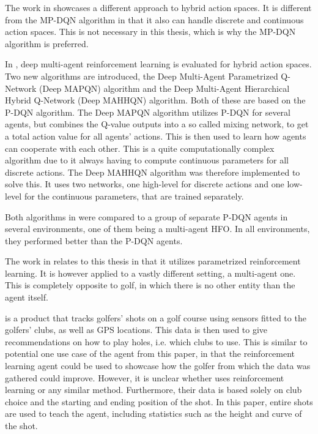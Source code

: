 \documentclass{kththesis}
\begin{document}
The work in \textcite{delalleau2019discrete} showcases a different approach to hybrid action spaces. It is different from the MP-DQN algorithm in that it also can handle discrete and continuous action spaces. This is not necessary in this thesis, which is why the MP-DQN algorithm is preferred.

In \textcite{fu2019deep}, deep multi-agent reinforcement learning is evaluated for hybrid action spaces. Two new algorithms are introduced, the Deep Multi-Agent Parametrized Q-Network (Deep MAPQN) algorithm and the Deep Multi-Agent Hierarchical Hybrid Q-Network (Deep MAHHQN) algorithm. Both of these are based on the P-DQN algorithm. The Deep MAPQN algorithm utilizes P-DQN for several agents, but combines the Q-value outputs into a so called mixing network, to get a total action value for all agents' actions. This is then used to learn how agents can cooperate with each other. This is a quite computationally complex algorithm due to it always having to compute continuous parameters for all discrete actions. The Deep MAHHQN algorithm was therefore implemented to solve this. It uses two networks, one high-level for discrete actions and one low-level for the continuous parameters, that are trained separately. 

Both algorithms in \textcite{fu2019deep} were compared to a group of separate P-DQN agents in several environments, one of them being a multi-agent HFO. In all environments, they performed better than the P-DQN agents. 

The work in \textcite{fu2019deep} relates to this thesis in that it utilizes parametrized reinforcement learning. It is however applied to a vastly different setting, a multi-agent one. This is completely opposite to golf, in which there is no other entity than the agent itself.

\textcite{ArccosGo0:online} is a product that tracks golfers' shots on a golf course using sensors fitted to the golfers' clubs, as well as GPS locations. This data is then used to give recommendations on how to play holes, i.e. which clubs to use. This is similar to potential one use case of the agent from this paper, in that the reinforcement learning agent could be used to showcase how the golfer from which the data was gathered could improve. However, it is unclear whether \textcite{ArccosGo0:online} uses reinforcement learning or any similar method. Furthermore, their data is based solely on club choice and the starting and ending position of the shot. In this paper, entire shots are used to teach the agent, including statistics such as the height and curve of the shot.
\end{document}

